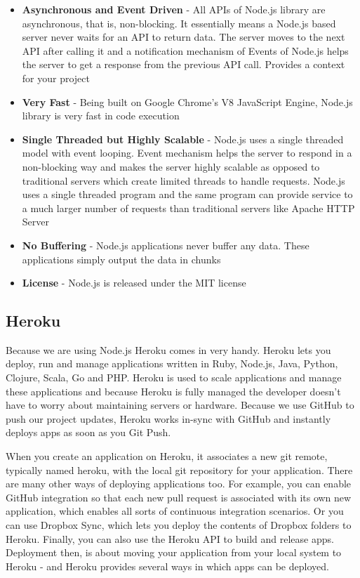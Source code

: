 \begin{itemize}

\item \textbf{Asynchronous and Event Driven}  - All APIs of Node.js library are asynchronous, that is, non-blocking. It essentially means a Node.js based server never waits for an API to return data. The server moves to the next API after calling it and a notification mechanism of Events of Node.js helps the server to get a response from the previous API call. Provides a context for your project\cite{node2}

\item \textbf{Very Fast} - Being built on Google Chrome's V8 JavaScript Engine, Node.js library is very fast in code execution \cite{node2}

\item \textbf{Single Threaded but Highly Scalable} - Node.js uses a single threaded model with event looping. Event mechanism helps the server to respond in a non-blocking way and makes the server highly scalable as opposed to traditional servers which create limited threads to handle requests. Node.js uses a single threaded program and the same program can provide service to a much larger number of requests than traditional servers like Apache HTTP Server\cite{node2}

\item \textbf{No Buffering} - Node.js applications never buffer any data. These applications simply output the data in chunks \cite{node2}

\item \textbf{License} - Node.js is released under the MIT license \cite{node2}

\end{itemize}


\subsection{Heroku}
Because we are using Node.js Heroku comes in very handy. Heroku lets you deploy, run and manage applications written in Ruby, Node.js, Java, Python, Clojure, Scala, Go and PHP. \cite{heroku} Heroku is used to scale applications and manage these applications and because Heroku is fully managed the developer doesn't have to worry about maintaining servers or hardware. Because we use GitHub to push our project updates, Heroku works in-sync with GitHub and instantly deploys apps as soon as you Git Push.

When you create an application on Heroku, it associates a new git remote, typically named heroku, with the local git repository for your application.\cite{heroku} There are many other ways of deploying applications too. For example, you can enable GitHub integration so that each new pull request is associated with its own new application, which enables all sorts of continuous integration scenarios. Or you can use Dropbox Sync, which lets you deploy the contents of Dropbox folders to Heroku. Finally, you can also use the Heroku API to build and release apps. \cite{heroku} Deployment then, is about moving your application from your local system to Heroku - and Heroku provides several ways in which apps can be deployed. \cite{heroku}

